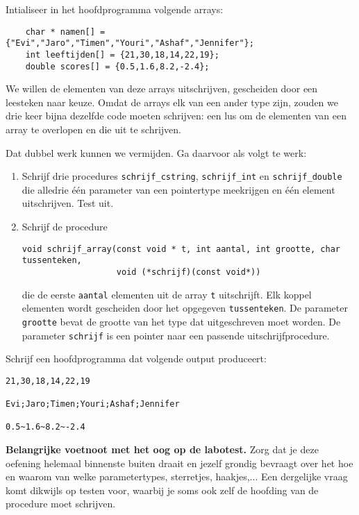 \beginoef
Intialiseer in het hoofdprogramma volgende arrays:
\begin{footnotesize}
\begin{verbatim}
    char * namen[] = {"Evi","Jaro","Timen","Youri","Ashaf","Jennifer"};
    int leeftijden[] = {21,30,18,14,22,19};
    double scores[] = {0.5,1.6,8.2,-2.4};
\end{verbatim}
\end{footnotesize}

We willen de elementen van deze arrays uitschrijven, gescheiden door een leesteken naar keuze. Omdat de arrays elk van een ander type zijn, zouden we drie keer bijna dezelfde code moeten schrijven: een lus om de elementen van een array te overlopen en die uit te schrijven. 

Dat dubbel werk kunnen we vermijden. Ga daarvoor als volgt te werk:
\begin{enumerate}
\item Schrijf drie procedures \verb}schrijf_cstring}, \verb}schrijf_int} en \verb}schrijf_double} die alledrie \'e\'en parameter van een pointertype meekrijgen en \'e\'en element uitschrijven. 
Test uit.
\item Schrijf de procedure 
\begin{verbatim}
void schrijf_array(const void * t, int aantal, int grootte, char tussenteken,
                   void (*schrijf)(const void*))
\end{verbatim}
die de eerste \verb}aantal} elementen uit de array \verb}t} uitschrijft. Elk koppel elementen wordt gescheiden door het opgegeven \verb}tussenteken}. 
De parameter \verb}grootte} bevat de grootte van het type dat uitgeschreven moet worden. De parameter \verb}schrijf} is een pointer naar een passende uitschrijfprocedure.
\end{enumerate}
\item Schrijf een hoofdprogramma dat volgende output produceert:
\begin{footnotesize}
\begin{verbatim}
21,30,18,14,22,19

Evi;Jaro;Timen;Youri;Ashaf;Jennifer

0.5~1.6~8.2~-2.4
\end{verbatim}
\end{footnotesize}
{\bf Belangrijke voetnoot met het oog op de labotest.} Zorg dat je deze oefening helemaal binnenste buiten draait en jezelf grondig bevraagt over het hoe en waarom van welke parametertypes, sterretjes, haakjes,... Een dergelijke vraag komt dikwijls op testen voor, waarbij je soms ook zelf de hoofding van de procedure moet schrijven.

\endoef

